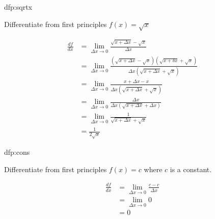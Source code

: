 \begin{defproblem}{dfp:sqrtx}%
 \begin{onlyproblem}%
 Differentiate from first principles $f(x) = \surd x$%
 \end{onlyproblem}%
 \begin{onlysolution}%
 \begin{align*}
 \frac{df}{dx} & = \lim_{\Delta x\rightarrow 0}\frac{\sqrt{x+\Delta x}-\surd x}{\Delta x}\\
  & = \lim_{\Delta x\rightarrow 0}\frac{(\sqrt{x+\Delta x}-\surd x)(\sqrt{x+\delta x}+\surd x)}{\Delta x(\sqrt{x+\Delta x}+\surd x)}\\
  & = \lim_{\Delta x\rightarrow 0}\frac{x+\Delta x - x}{\Delta x(\sqrt{x+\Delta x}+\surd x)}\\
  & = \lim_{\Delta x\rightarrow 0}\frac{\Delta x}{\Delta x(\sqrt{x+\Delta x}+\Delta x)}\\
  & = \lim_{\Delta x\rightarrow 0}\frac{1}{\sqrt{x+\Delta x}+\surd x}\\
  & = \frac{1}{2\surd x}
 \end{align*}%
 \end{onlysolution}
\end{defproblem}

\begin{defproblem}{dfp:cons}%
 \begin{onlyproblem}%
 Differentiate from first principles $f(x) = c$ where $c$ is a
 constant.%
 \end{onlyproblem}%
 \begin{onlysolution}%
 \begin{align*}
 \frac{df}{dx} & = \lim_{\Delta x\rightarrow 0}\frac{c-c}{\Delta x}\\
  & = \lim_{\Delta x\rightarrow 0}0\\
  & = 0
 \end{align*}%
 \end{onlysolution}%
\end{defproblem}

